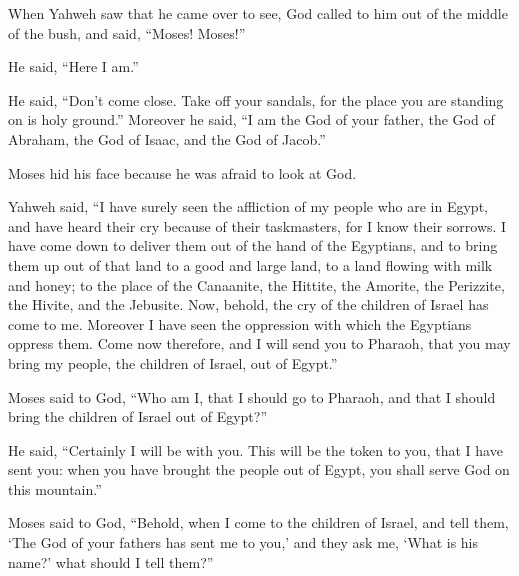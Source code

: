  When Yahweh saw that he came over to see, God called to him
out of the middle of the bush, and said, ``Moses! Moses!''

He said, ``Here I am.''

 He said, ``Don't come close. Take off your sandals, for the
place you are standing on is holy ground.''  Moreover he
said, ``I am the God of your father, the God of Abraham, the God of
Isaac, and the God of Jacob.''

Moses hid his face because he was afraid to look at God.

 Yahweh said, ``I have surely seen the affliction of my
people who are in Egypt, and have heard their cry because of their
taskmasters, for I know their sorrows.  I have come down to
deliver them out of the hand of the Egyptians, and to bring them up out
of that land to a good and large land, to a land flowing with milk and
honey; to the place of the Canaanite, the Hittite, the Amorite, the
Perizzite, the Hivite, and the Jebusite.  Now, behold, the
cry of the children of Israel has come to me. Moreover I have seen the
oppression with which the Egyptians oppress them.  Come now
therefore, and I will send you to Pharaoh, that you may bring my people,
the children of Israel, out of Egypt.''

 Moses said to God, ``Who am I, that I should go to
Pharaoh, and that I should bring the children of Israel out of Egypt?''

 He said, ``Certainly I will be with you. This will be the
token to you, that I have sent you: when you have brought the people out
of Egypt, you shall serve God on this mountain.''

 Moses said to God, ``Behold, when I come to the children
of Israel, and tell them, `The God of your fathers has sent me to you,'
and they ask me, `What is his name?' what should I tell them?''

